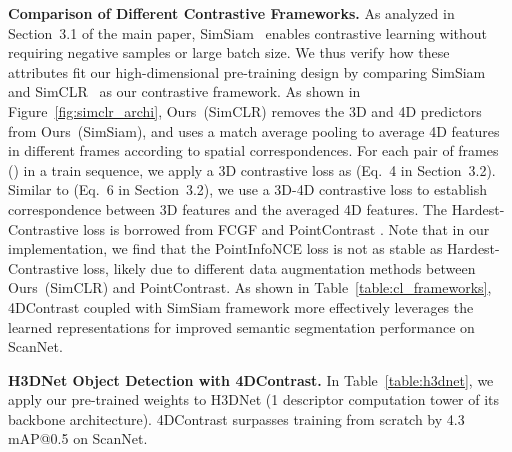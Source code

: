 \documentclass[runningheads]{llncs}
\newcommand{\OURS}{4DContrast}
\begin{document}
\begin{table}[th!]
\centering
\caption{Semantic and instance segmentation on S3DIS.}
\vspace{-0.2cm}
        \label{table:s3dis}
\end{table}

\noindent\textbf{Comparison of Different Contrastive Frameworks.}
As analyzed in Section~3.1 of the main paper, SimSiam~\cite{chen2021exploring} enables contrastive learning without requiring negative samples or large batch size. We thus verify how these attributes fit our high-dimensional pre-training design by comparing SimSiam and SimCLR~\cite{chen2020simple} as our contrastive framework. 
As shown in Figure~\ref{fig:simclr_archi}, Ours~(SimCLR) removes the 3D and 4D predictors from Ours~(SimSiam), and uses a match average pooling to average 4D features in different frames according to spatial correspondences. For each pair of frames () in a train sequence, we apply a 3D contrastive loss   as  (Eq.~4 in Section~3.2). Similar to  (Eq.~6 in Section~3.2), we use a 3D-4D contrastive loss  to establish correspondence between 3D features and the averaged 4D features. The Hardest-Contrastive loss is borrowed from FCGF \cite{choy2019fully} and PointContrast \cite{xie2020pointcontrast}. 
Note that in our implementation, we find that the PointInfoNCE loss \cite{xie2020pointcontrast} is not as stable as Hardest-Contrastive loss, likely due to  different data augmentation methods between Ours~(SimCLR) and PointContrast.
As shown in Table~\ref{table:cl_frameworks}, \OURS{} coupled with SimSiam framework more effectively leverages the learned representations for improved semantic segmentation performance on ScanNet.

\noindent\textbf{H3DNet Object Detection with \OURS{}.} In Table~\ref{table:h3dnet}, we apply our pre-trained weights to H3DNet \cite{zhang2020h3dnet} (1 descriptor computation tower of its backbone architecture). \OURS{} surpasses training from scratch by 4.3 mAP@0.5 on ScanNet.
\end{document}
